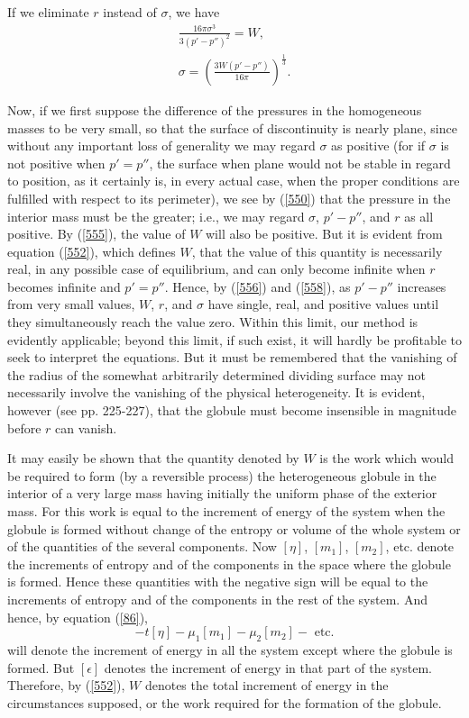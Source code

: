 \documentclass[12pt]{article}
\begin{document}
{If we eliminate $r$ instead of $\sigma$, we have
\begin{gather}
\frac{16 \pi \sigma^3}{3(p'-p'')^2} = W,  \label{557} \\
\sigma = \left( \frac{3W(p'-p'')}{16\pi}\right)^{\frac{1}{3}}.  \label{558} \end{gather}

Now, if we first suppose the difference of the pressures in the homogeneous masses to be very small, so that the surface of discontinuity is nearly plane, since without any important loss of generality we may regard $\sigma$ as positive (for if $\sigma$ is not positive when $p'=p''$, the surface when plane would not be stable in regard to position, as it certainly is, in every actual case, when the proper conditions are fulfilled with respect to its perimeter), we see by (\ref{550}) that the pressure in the interior mass must be the greater; i.e., we may regard $\sigma$, $p'-p''$, and $r$ as all positive. By (\ref{555}), the value of $W$ will also be positive. But it is evident from equation (\ref{552}), which defines $W$, that the value of this quantity is necessarily real, in any possible case of equilibrium, and can only become infinite when $r$ becomes infinite and $p'=p''$. Hence, by (\ref{556}) and (\ref{558}), as $p'-p''$ increases from very small values, $W$, $r$, and $\sigma$ have single, real, and positive values until they simultaneously reach the value zero. Within this limit, our method is evidently applicable; beyond this limit, if such exist, it will hardly be profitable to seek to interpret the equations. But it must be remembered that the vanishing of the radius of the somewhat arbitrarily determined dividing surface may not necessarily involve the vanishing of the physical heterogeneity. It is evident, however (see pp. 225-227), that the globule must become insensible in magnitude before $r$ can vanish.

It may easily be shown that the quantity denoted by $W$ is the work which would be required to form (by a reversible process) the heterogeneous globule in the interior of a very large mass having initially the uniform phase of the exterior mass. For this work is equal to the increment of energy of the system when the globule is formed without change of the entropy or volume of the whole system or of the quantities of the several components. Now $[\eta]$, $[m_1]$, $[m_2]$, etc. denote the increments of entropy and of the components in the space where the globule is formed. Hence these quantities with the negative sign will be equal to the increments of entropy and of the components in the rest of the system. And hence, by equation (\ref{86}),
$$ -t[\eta] -\mu_1[m_1] -\mu_2[m_2]-\text{ etc.}$$
will denote the increment of energy in all the system except where the globule is formed. But $[\epsilon]$ denotes the increment of energy in that part of the system. Therefore, by (\ref{552}), $W$ denotes the total increment of energy in the circumstances supposed, or the work required for the formation of the globule.

}
\end{document}
